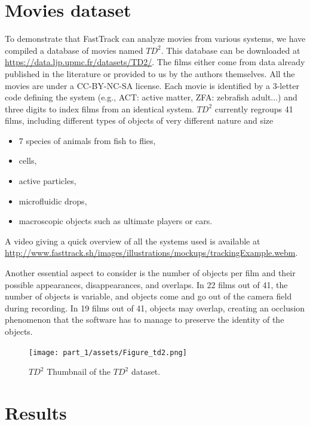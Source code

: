 \chapter{Movies dataset}
    To demonstrate that FastTrack can analyze movies from various systems, we have compiled a database of movies named $TD^2$. This database can be downloaded at \url{https://data.ljp.upmc.fr/datasets/TD2/}. The films either come from data already published in the literature or provided to us by the authors themselves. All the movies are under a CC-BY-NC-SA license. Each movie is identified by a 3-letter code defining the system (e.g., ACT: active matter, ZFA: zebrafish adult...) and three digits to index films from an identical system. $TD^2$ currently regroups 41 films, including different types of objects of very different nature and size
    \begin{itemize}
    \item 7 species of animals from fish to flies,
    \item cells,
    \item active particles,
    \item microfluidic drops,
    \item macroscopic objects such as ultimate players or cars.
    \end{itemize}
    A video giving a quick overview of all the systems used is available at \url{http://www.fasttrack.sh/images/illustrations/mockups/trackingExample.webm}.

    Another essential aspect to consider is the number of objects per film and their possible appearances, disappearances, and overlaps. In 22 films out of 41, the number of objects is variable, and objects come and go out of the camera field during recording. In 19 films out of 41, objects may overlap, creating an occlusion phenomenon that the software has to manage to preserve the identity of the objects.

	\begin{figure}[ht]
    \centering
    \texttt{[image: part\_1/assets/Figure\_td2.png]}    
    \caption{{\bf $TD^2$} Thumbnail of the $TD^2$ dataset.}
    \label{part_1:fig_5}
    \end{figure}

    


\chapter{Results}

